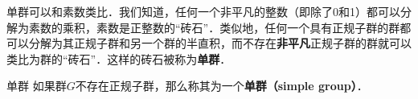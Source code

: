 

单群可以和素数类比．我们知道，任何一个非平凡的整数（即除了0和1）都可以分解为素数的乘积，素数是正整数的“砖石”．类似地，任何一个具有正规子群的群都可以分解为其正规子群和另一个群的半直积，而不存在\textbf{非平凡}正规子群的群就可以类比为群的“砖石”．这样的砖石被称为\textbf{单群}．

\begin{definition}{单群}
如果群$G$不存在正规子群，那么称其为一个\textbf{单群（simple group）}．
\end{definition}













